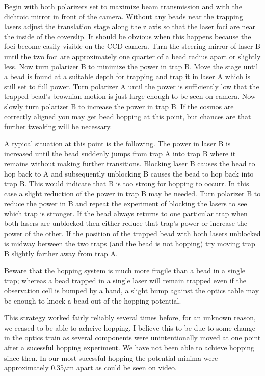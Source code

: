 \documentclass{report}
\begin{document}
Begin with both polarizers set to maximize beam transmission and with the dichroic mirror in front of the camera. Without any beads near the trapping lasers adjust the translation stage along the z axis so that the laser foci are near the inside of the coverslip. It should be obvious when this happens because the foci become easily visible on the CCD camera. Turn the steering mirror of laser B until the two foci are approximately one quarter of a bead radius apart or slightly less. Now turn polarizer B to minimize the power in trap B. Move the stage until a bead is found at a suitable depth for trapping and trap it in laser A which is still set to full power. Turn polarizer A until the power is sufficiently low that the trapped bead's brownian motion is just large enough to be seen on camera. Now slowly turn polarizer B to increase the power in trap B. If the cosmos are correctly aligned you may get bead hopping at this point, but chances are that further tweaking will be necessary.

A typical situation at this point is the following. The power in laser B is increased until the bead suddenly jumps from trap A into trap B where it remains without making further transitions. Blocking laser B causes the bead to hop back to A and subsequently unblocking B causes the bead to hop back into trap B. This would indicate that B is too strong for hopping to occurr. In this case a slight reduction of the power in trap B may be needed. Turn polarizer B to reduce the power in B and repeat the experiment of blocking the lasers to see which trap is stronger. If the bead always returns to one particular trap when both lasers are unblocked then either reduce that trap's power or increase the power of the other. If the position of the trapped bead with both lasers unblocked is midway between the two traps (and the bead is not hopping) try moving trap B slightly farther away from trap A.

Beware that the hopping system is much more fragile than a bead in a single trap; whereas a bead trapped in a single laser will remain trapped even if the observation cell is bumped by a hand, a slight bump against the optics table may be enough to knock a bead out of the hopping potential.

This strategy worked fairly reliably several times before, for an unknown reason, we ceased to be able to acheive hopping. I believe this to be due to some change in the optics train as several components were unintentionally moved at one point after a sucessful hopping experiment. We have not been able to achieve hopping since then. In our most sucessful hopping the potential minima were approximately 0.35$\mu$m apart as could be seen on video.
\end{document}
